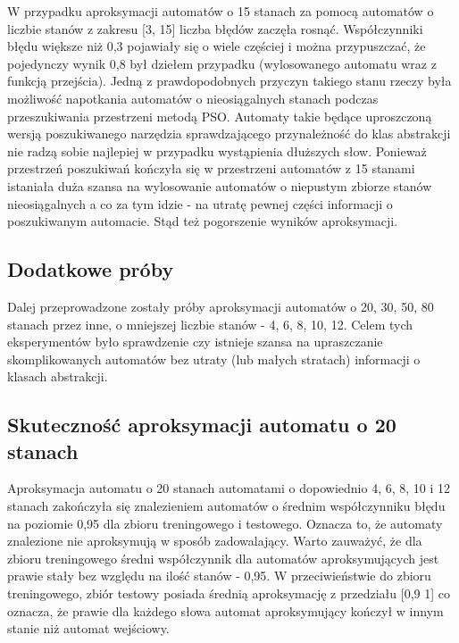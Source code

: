 \documentclass[runningheads,a4paper]{llncs}
\begin{document}
W przypadku aproksymacji automatów o 15 stanach za pomocą automatów o liczbie stanów z zakresu [3, 15] liczba błędów zaczęła rosnąć. Współczynniki błędu większe niż 0,3 pojawiały się o wiele częściej i można przypuszczać, że pojedynczy wynik 0,8 był dziełem przypadku (wylosowanego automatu wraz z funkcją przejścia). Jedną z prawdopodobnych przyczyn takiego stanu rzeczy była możliwość napotkania automatów o nieosiągalnych stanach podczas przeszukiwania przestrzeni metodą PSO. Automaty takie będące uproszczoną wersją poszukiwanego narzędzia sprawdzającego przynależność do klas abstrakcji nie radzą sobie najlepiej w przypadku wystąpienia dłuższych słow. Ponieważ przestrzeń poszukiwań kończyła się w przestrzeni automatów z 15 stanami istaniała duża szansa na wylosowanie automatów o niepustym zbiorze stanów nieosiągalnych a co za tym idzie - na utratę pewnej części informacji o poszukiwanym automacie. Stąd też pogorszenie wyników aproksymacji. \\


\FloatBarrier
\subsection{Dodatkowe próby}
Dalej przeprowadzone zostały próby aproksymacji automatów o 20, 30, 50, 80 stanach przez inne, o mniejszej liczbie stanów - 4, 6, 8, 10, 12. Celem tych eksperymentów było sprawdzenie czy istnieje szansa na upraszczanie skomplikowanych automatów bez utraty (lub małych stratach) informacji o klasach abstrakcji. \\

\FloatBarrier
\subsection{Skuteczność aproksymacji automatu o 20 stanach}

Aproksymacja automatu o 20 stanach automatami o dopowiednio 4, 6, 8, 10 i 12 stanach zakończyła się znalezieniem automatów o średnim współczynniku błędu na poziomie 0,95 dla zbioru treningowego i testowego. Oznacza to, że automaty znalezione nie aproksymują w sposób zadowalający. Warto zauważyć, że dla zbioru treningowego średni współczynnik dla automatów aproksymujących jest prawie stały bez względu na ilość stanów - 0,95. W przeciwieństwie do zbioru treningowego, zbiór testowy posiada średnią aproksymację z przedziału [0,9 1] co oznacza, że prawie dla każdego słowa automat aproksymujący kończył w innym stanie niż automat wejściowy.  \\
\end{document}
